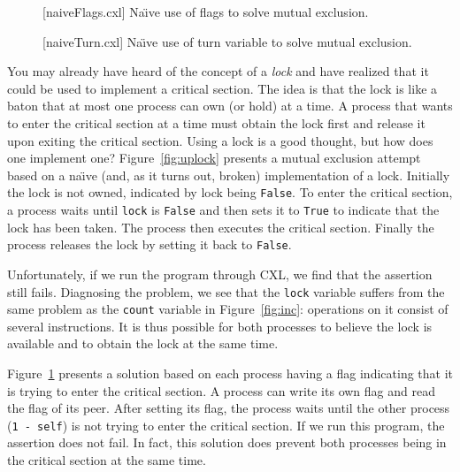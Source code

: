 \documentclass{report}
\newenvironment{code}{
\tcolorbox
}{
\endtcolorbox
}
\begin{document}
\begin{figure}
\begin{code}
\end{code}
\caption{[naiveFlags.cxl] Na\"{\i}ve use of flags to solve mutual exclusion.}
\label{fig:upflags}
\end{figure}

\begin{figure}
\begin{code}
\end{code}
\caption{[naiveTurn.cxl] Na\"{\i}ve use of turn variable to solve mutual exclusion.}
\label{fig:upturn}
\end{figure}

You may already have heard of the concept of a \emph{lock}
and have realized that
it could be used to implement a critical section.
The idea is that the lock is like a baton that at most one process can own
(or hold) at a time.
A process that wants to enter the critical section at a time must obtain the
lock first and release it upon exiting the critical section.
Using a lock is a good thought, but how does one implement one?
Figure~\ref{fig:uplock} presents a mutual exclusion attempt based on a
na\"{\i}ve (and, as it turns out, broken) implementation of a lock.
Initially the lock is not owned, indicated by lock being \texttt{False}.
To enter the critical section, a process waits until \texttt{lock} is \texttt{False}
and then sets it to \texttt{True} to indicate that the lock has been taken.
The process then executes the critical section.  Finally the process
releases the lock by setting it back to \texttt{False}.

Unfortunately, if we run the program through CXL, we find that the assertion still
fails.  Diagnosing the problem, we see that the \texttt{lock} variable
suffers from the same problem as the \texttt{count} variable
in Figure~\ref{fig:inc}: operations
on it consist of several instructions.  It is thus possible
for both processes to believe the lock is available and to obtain the lock
at the same time.

Figure~\ref{fig:upflags} presents a solution based on each process having
a flag indicating that it is trying to enter the critical section.
A process can write its own flag and read the flag of its peer.
After setting its flag, the process waits until the other process
(\texttt{1 - self}) is not trying to enter the critical section.
If we run this program, the assertion does not fail.  In fact, this
solution does prevent both processes being in the critical section at
the same time.
\end{document}
